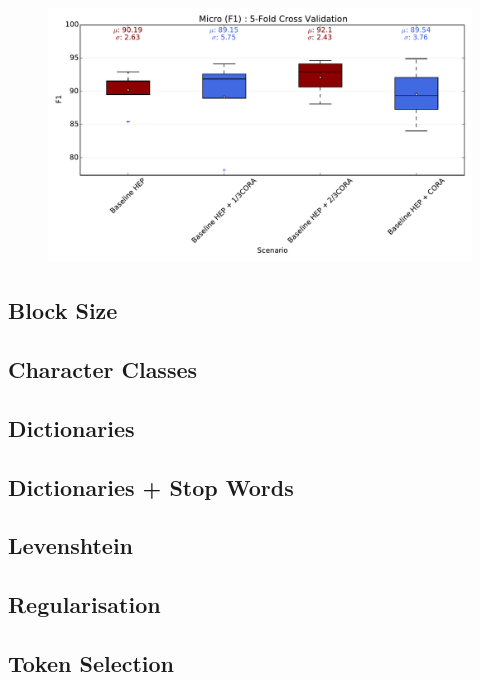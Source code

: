 \begin{figure}[h]
\center
\includegraphics[width=5.5in]{Figures/micro_subsampling.pdf}
\caption{}
\label{fig:references}
\end{figure}


\subsection{Block Size}

\subsection{Character Classes}

\subsection{Dictionaries}

\subsection{Dictionaries + Stop Words}

\subsection{Levenshtein}

\subsection{Regularisation}

\subsection{Token Selection}

